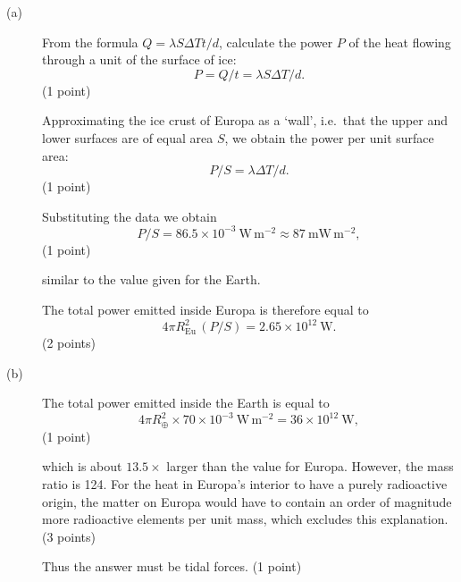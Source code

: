 \begin{description}
\item[(a)] From the formula $Q = \lambda S \Delta T t / d$, calculate the power
  $P$ of the heat flowing through a unit of the surface of ice:
  \[
    P = Q/t = \lambda S \Delta T / d.
  \]
  \hfill(1 point)

  Approximating the ice crust of Europa as a `wall', i.e.\ that the upper and
  lower surfaces are of equal area $S$, we obtain the power per unit surface
  area:
  \[
    P/S = \lambda \Delta T / d.
  \]
  \hfill(1 point)

  Substituting the data we obtain
  \[
    P/S = 86.5 \times 10^{-3}\ \mathrm{W\,m^{-2}}
        \approx 87\ \mathrm{mW\,m^{-2}},
  \]
  \hfill(1 point)

  similar to the value given for the Earth.

  The total power emitted inside Europa is therefore equal to
  \[
    4\pi R_{\mathrm{Eu}}^2 \, (P/S) = 2.65 \times 10^{12}\ \mathrm{W}.
  \]
  \hfill(2 points)

\item[(b)] The total power emitted inside the Earth is equal to
  \[
    4\pi R_{\oplus}^2 \times 70 \times 10^{-3}\ \mathrm{W\,m^{-2}}
      = 36 \times 10^{12}\ \mathrm{W},
  \]
  \hfill(1 point)

  which is about $13.5\times$ larger than the value for Europa. However, the
  mass ratio is 124. For the heat in Europa's interior to have a purely
  radioactive origin, the matter on Europa would have to contain an order of
  magnitude more radioactive elements per unit mass, which excludes this
  explanation.
  \hfill(3 points)

  Thus the answer must be tidal forces.
  \hfill(1 point)
\end{description}

